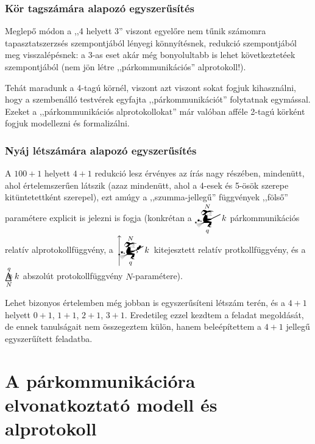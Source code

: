 \documentclass{article}
\newcommand{\mainfuncomm}[3]{\mathwitch_{#2}^{#1}#3}
\newcommand{\mainfunext}[3]{\left\uparrow\!\!\!\mathwitch*_{#2}^{#1}#3\right.}
\begin{document}
	\subsubsection{Kör tagszámára alapozó egyszerűsítés}

	Meglepő módon a ,,4 helyett 3'' viszont egyelőre nem tűnik számomra tapasztatszerzsés szempontjából  lényegi könnyítésnek, redukció szempontjából meg  visszalépésnek: a 3-as eset akár még bonyolultabb is lehet következtetéek szempontjából (nem jön létre ,,párkommunikációs'' alprotokoll!).

	Tehát maradunk a 4-tagú körnél, viszont azt viszont sokat fogjuk kihasználni, hogy a szembenálló testvérek egyfajta ,,párkommunikációt'' folytatnak egymással. Ezeket a ,,párkommunikációs alprotokollokat'' már valóban afféle 2-tagú körként fogjuk modellezni és formalizálni.%


	\subsubsection{Nyáj létszámára alapozó egyszerűsítés}

	A $100 + 1$ helyett $4 + 1$ redukció lesz érvényes az írás nagy részében, mindenütt, ahol értelemszerűen látszik (azaz mindenütt, ahol a 4-esek és 5-ösök szerepe kitüntetettként szerepel), ezt amúgy a ,,szumma-jellegű'' függvények ,,fölső'' paramétere explicit is jelezni is fogja (konkrétan a $\displaystyle\mainfuncomm Nqk$ párkommunikációs relatív alprotokollfüggvény, a $\displaystyle\mainfunext Nqk$ kitejesztett relatív protkollfüggvény, és a $\mathop{\bigtriangleup\mspace{-14.607mu}\divideontimes}\limits_N^qk$ abszolút protokollfüggvény $N$-paramétere).

	Lehet bizonyos értelemben még jobban is egyszerűsíteni létszám terén, és a $4+1$ helyett $0+1$,  $1+1$,  $2+1$,  $3+1$. Eredetileg ezzel kezdtem a feladat megoldását, de ennek tanulságait nem összegeztem külön, hanem beleépítettem a $4+1$ jellegű egyszerűített feladatba.


	\section{A párkommunikációra elvonatkoztató modell és alprotokoll}
\end{document}
